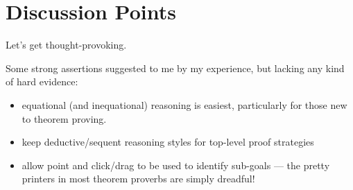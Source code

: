 \documentclass[EPiC]{easychair}
\begin{document}
\section{Discussion Points}

Let's get thought-provoking.

Some strong assertions suggested to me by my experience, but lacking any kind of hard evidence:
\begin{itemize}
  \item
     equational (and inequational) reasoning is easiest, particularly for those new to theorem proving.
  \item
    keep deductive/sequent reasoning styles for top-level proof strategies
  \item
    allow point and click/drag to be used to identify sub-goals
    ---
    the  pretty printers in most theorem proverbs are simply dreadful!
\end{itemize}



\label{sect:bib}

%
%
%



\end{document}
